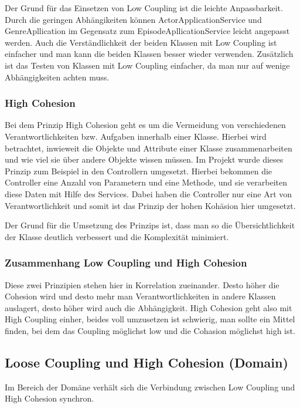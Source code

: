 			Der Grund für das Einsetzen von Low Coupling ist die leichte Anpassbarkeit. Durch die geringen Abhängikeiten können ActorApplicationService und GenreApllication im Gegensatz zum EpisodeApllicationService leicht angepasst werden. Auch die Verständlichkeit der beiden Klassen mit Low Coupling ist einfacher und man kann die beiden Klassen besser wieder verwenden. Zusätzlich ist das Testen von Klassen mit Low Coupling einfacher, da man nur auf wenige Abhängigkeiten achten muss.
		
		\subsubsection{High Cohesion}
			Bei dem Prinzip High Cohesion geht es um die Vermeidung von verschiedenen Verantwortlichkeiten bzw. Aufgaben innerhalb einer Klasse. Hierbei wird betrachtet, inwieweit die Objekte und Attribute einer Klasse zusammenarbeiten und wie viel sie über andere Objekte wissen müssen. Im Projekt wurde dieses Prinzip zum Beispiel in den Controllern umgesetzt. Hierbei bekommen die Controller eine Anzahl von Parametern und eine Methode, und sie verarbeiten diese Daten mit Hilfe des Services. Dabei haben die Controller nur eine Art von Verantwortlichkeit und somit ist das Prinzip der hohen Kohäsion hier umgesetzt.
			
			Der Grund für die Umsetzung des Prinzips ist, dass man so die Übersichtlichkeit der Klasse deutlich verbessert und die Komplexität minimiert.
			
		\subsubsection{Zusammenhang Low Coupling und High Cohesion}
		Diese zwei Prinzipien stehen hier in Korrelation zueinander. Desto höher die Cohesion wird und desto mehr man Verantwortlichkeiten in andere Klassen auslagert, desto höher wird auch die Abhängigkeit. High Cohesion geht also mit High Coupling einher, beides voll umzusetzen ist schwierig, man sollte ein Mittel finden, bei dem das Coupling möglichst low und die Cohasion möglichst high ist.
	
	\subsection{Loose Coupling und High Cohesion (Domain)}
	Im Bereich der Domäne verhält sich die Verbindung zwischen Low Coupling und High Cohesion synchron.
	
